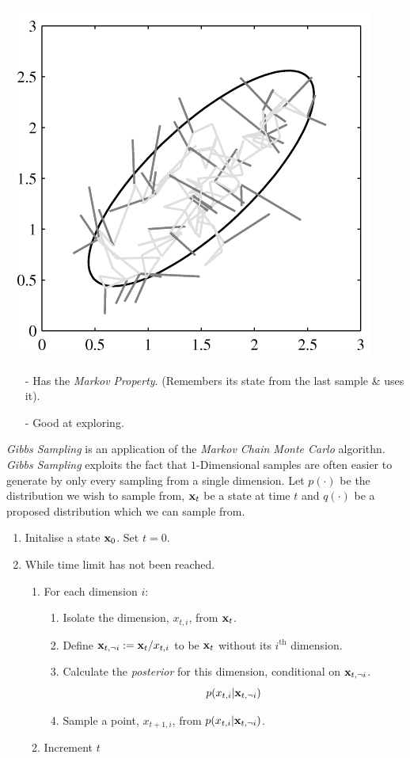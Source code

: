\documentclass[11pt,a4paper]{article}
\begin{document}
\begin{center}
\includegraphics[scale=.5]{img/mcmc.png}
\end{center}

\begin{itemize}
	\item[-] Has the \textit{Markov Property}. (\ie Remembers its state from the last sample \& uses it).
	\item[-] Good at exploring.
\end{itemize}

\textit{Gibbs Sampling} is an application of the \textit{Markov Chain Monte Carlo} algorithn. \textit{Gibbs Sampling} exploits the fact that $1$-Dimensional samples are often easier to generate by only every sampling from a single dimension.
Let $p(\cdot)$ be the distribution we wish to sample from, $\textbf{x}_t$ be a state at time $t$ and $q(\cdot)$ be a proposed distribution which we can sample from.
\begin{enumerate}
	\item Initalise a state $\textbf{x}_0$. Set $t=0$.
	\item While time limit has not been reached.
	\begin{enumerate}
		\item For each dimension $i$:
		\begin{enumerate}[label=\arabic*)]
			\item Isolate the dimension, $x_{t,i}$, from $\textbf{x}_t$.
			\item Define $\textbf{x}_{t,\neg i}:=\textbf{x}_t/x_{t,i}$ to be $\textbf{x}_t$ without its $i^\text{th}$ dimension.
			\item Calculate the \textit{posterior} for this dimension, conditional on $\textbf{x}_{t,\neg i}$.
			$$p(x_{t,i}|\textbf{x}_{t,\neg i})$$
			\item Sample a point, $x_{t+1,i}$, from $p(x_{t,i}|\textbf{x}_{t,\neg i})$.	
		\end{enumerate}
		\item Increment $t$
	\end{enumerate}
\end{enumerate}
\end{document}
